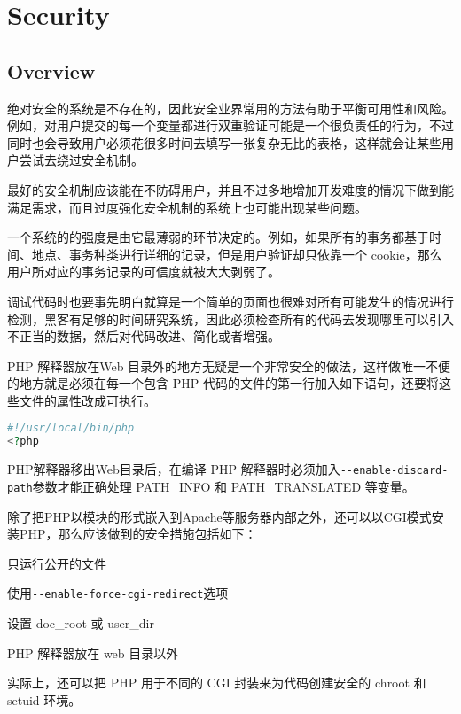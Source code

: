 \part{Security}


\chapter{Overview}


绝对安全的系统是不存在的，因此安全业界常用的方法有助于平衡可用性和风险。例如，对用户提交的每一个变量都进行双重验证可能是一个很负责任的行为，不过同时也会导致用户必须花很多时间去填写一张复杂无比的表格，这样就会让某些用户尝试去绕过安全机制。



最好的安全机制应该能在不防碍用户，并且不过多地增加开发难度的情况下做到能满足需求，而且过度强化安全机制的系统上也可能出现某些问题。

一个系统的的强度是由它最薄弱的环节决定的。例如，如果所有的事务都基于时间、地点、事务种类进行详细的记录，但是用户验证却只依靠一个 cookie，那么用户所对应的事务记录的可信度就被大大剥弱了。

调试代码时也要事先明白就算是一个简单的页面也很难对所有可能发生的情况进行检测，黑客有足够的时间研究系统，因此必须检查所有的代码去发现哪里可以引入不正当的数据，然后对代码改进、简化或者增强。

PHP 解释器放在Web 目录外的地方无疑是一个非常安全的做法，这样做唯一不便的地方就是必须在每一个包含 PHP 代码的文件的第一行加入如下语句，还要将这些文件的属性改成可执行。

\begin{lstlisting}[language=PHP]
#!/usr/local/bin/php
<?php
\end{lstlisting}

PHP解释器移出Web目录后，在编译 PHP 解释器时必须加入\texttt{-\/-enable-discard-path}参数才能正确处理 PATH\_INFO 和 PATH\_TRANSLATED 等变量。


除了把PHP以模块的形式嵌入到Apache等服务器内部之外，还可以以CGI模式安装PHP，那么应该做到的安全措施包括如下：

\begin{compactitem}
\item 只运行公开的文件
\item 使用\texttt{-\/-enable-force-cgi-redirect}选项
\item 设置 doc\_root 或 user\_dir
\item PHP 解释器放在 web 目录以外
\end{compactitem}

实际上，还可以把 PHP 用于不同的 CGI 封装来为代码创建安全的 chroot 和 setuid 环境。

